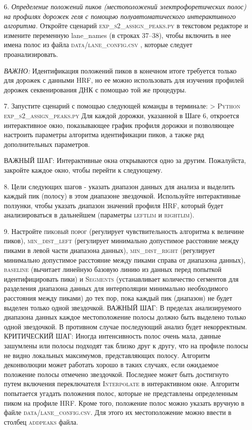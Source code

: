     

    
    
    6. \emph{Определение положений пиков (местоположений электрофоретических полос) на профилях дорожек геля с помощью полуавтоматического интерактивного алгоритма.} Откройте сценарий \textsc{exp\_s2\_assign\_peaks.py}  в текстовом редакторе и измените переменную lane\_names (в строках 37–38), чтобы включить в нее имена полос из файла \textsc{data/lane\_config.csv} , которые следует проанализировать.

\emph{ВАЖНО:} Идентификация положений пиков в конечном итоге требуется только для дорожек с данными HRF, но ее можно использовать для изучения профилей дорожек секвенирования ДНК с помощью той же процедуры.

    7. Запустите сценарий с помощью следующей команды в терминале:
    \textsc{> Python exp\_s2\_assign\_peaks.py}
    Для каждой дорожки, указанной в Шаге 6, откроется интерактивное окно, показывающее график профиля дорожки и позволяющее настроить параметры алгоритма идентификации пиков, а также ряд дополнительных параметров.

    ВАЖНЫЙ ШАГ: Интерактивные окна открываются одно за другим. Пожалуйста, закройте каждое окно, чтобы перейти к следующему.
    
    8. Цели следующих шагов - указать диапазон данных для анализа и выделить каждый пик (полосу) в этом диапазоне звездочкой. Используйте интерактивные ползунки, чтобы указать диапазон значений профиля HRF, который будет анализироваться в дальнейшем (параметры \textsc{leftlim} и \textsc{rightlim}).

    9. Настройте \textsc{пиковый порог} (регулирует чувствительность алгоритма к величине пиков), \textsc{min\_dist\_left} (регулирует минимально допустимое расстояние между пиками в левой части диапазона данных), \textsc{min\_dist\_right} (регулирует минимально допустимое расстояние между пиками справа от диапазона данных), \textsc{baseline} (вычитает линейную базовую линию из данных перед попыткой идентифицировать пики) и \textsc{Segments} (устанавливает количество сегментов для разделения диапазона данных для интерполяции минимально необходимого расстояния между пиками) до тех пор, пока каждый пик (диапазон) не будет выделен только одной звездочкой.
        ВАЖНЫЙ ШАГ: В пределах анализируемого диапазона данных каждое местоположение полосы должно быть выделено только одной звездочкой. В противном случае последующий анализ будет некорректным.
        КРИТИЧЕСКИЙ ШАГ: Иногда интенсивность полос очень мала, данные зашумлены или полосы подходят так близко друг к другу, что на профиле полосы не видно локальных максимумов, представляющих полосу. Алгоритм деконволюции может работать хорошо в таких случаях, если ожидаемое положение полосы отмечено звездочкой. Последнее может быть достигнуто путем включения переключателя \textsc{Interpolate} в интерактивном окне. Алгоритм попытается угадать положения полос, которые не представлены определенным пиком на профиле HRF. Кроме того, положение полос можно указать вручную в файле \textsc{data/lane\_config.csv}. Для этого их местоположение можно ввести в столбец \textsc{addpeaks} файла.
    
